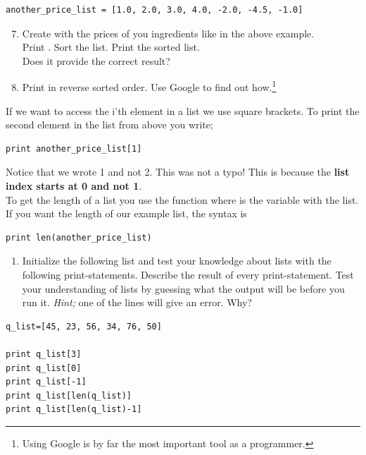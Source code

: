 \documentclass{article}
\begin{document}
\begin{lstlisting}
another_price_list = [1.0, 2.0, 3.0, 4.0, -2.0, -4.5, -1.0]
\end{lstlisting}


\begin{enumerate}
  \setcounter{enumi}{6}
   \item Create  with the prices of you ingredients like in the above example.\\
Print . Sort the list. Print the sorted list. \\
  Does it provide the correct result?

  \item Print  in reverse sorted order.
    Use Google to find out how.\footnote{Using Google is
    by far the most important tool as a programmer.}
\end{enumerate}


If we want to access the i'th element in a list
we use square brackets. To print the second element
in the list from above you write;

\begin{lstlisting}
print another_price_list[1]
\end{lstlisting}

Notice that we wrote 1 and not 2. This was not a typo!
This is because the {\bf{list index starts at 0 and not 1}}.\\

To get the length of a list you use the function 
where  is the variable with the list.
If you want the length of our example list, the syntax is

\begin{lstlisting}
print len(another_price_list)
\end{lstlisting}


\begin{enumerate}[resume]
  \item Initialize the following list and test your knowledge about
    lists with the following print-statements.
    Describe the result of every print-statement. Test your
    understanding of lists by guessing what the output will be before
    you run it. 
    {\em Hint;} one of the lines will give an error. Why?
\end{enumerate}
\begin{lstlisting}
q_list=[45, 23, 56, 34, 76, 50]

print q_list[3]
print q_list[0]
print q_list[-1]
print q_list[len(q_list)]
print q_list[len(q_list)-1]
\end{lstlisting}
\end{document}
